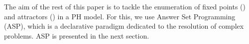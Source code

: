 \medskip
The aim of the rest of this paper is to tackle the enumeration of fixed points () and attractors () in a PH model.
For this, we use Answer Set Programming (ASP), which is a declarative paradigm dedicated to the resolution of complex problems. ASP is presented in the next section.
